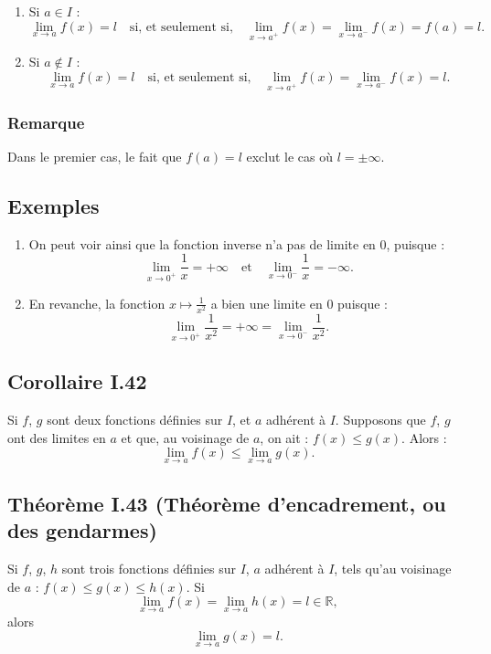 \documentclass{article}
\begin{document}
	\begin{enumerate}
		\item Si $a \in I$ : 
		\[
		\lim_{x \to a} f(x) = l \quad \text{si, et seulement si,} \quad \lim_{x \to a^+} f(x) = \lim_{x \to a^-} f(x) = f(a) = l.
		\]
		
		\item Si $a \notin I$ : 
		\[
		\lim_{x \to a} f(x) = l \quad \text{si, et seulement si,} \quad \lim_{x \to a^+} f(x) = \lim_{x \to a^-} f(x) = l.
		\]
	\end{enumerate}
	
	\subsubsection*{Remarque}
	
	Dans le premier cas, le fait que $f(a) = l$ exclut le cas où $l = \pm \infty$.
	
	\subsection{Exemples}
	
	\begin{enumerate}
		\item On peut voir ainsi que la fonction inverse n’a pas de limite en 0, puisque :
		\[
		\lim_{x \to 0^+} \frac{1}{x} = +\infty \quad \text{et} \quad \lim_{x \to 0^-} \frac{1}{x} = -\infty.
		\]
		
		\item En revanche, la fonction $x \mapsto \frac{1}{x^2}$ a bien une limite en 0 puisque :
		\[
		\lim_{x \to 0^+} \frac{1}{x^2} = +\infty = \lim_{x \to 0^-} \frac{1}{x^2}.
		\]
	\end{enumerate}
	\subsection{Corollaire I.42}
	Si \( f \), \( g \) sont deux fonctions définies sur \( I \), et \( a \) adhérent à \( I \). Supposons que \( f \), \( g \) ont des limites en \( a \) et que, au voisinage de \( a \), on ait : \( f(x) \leq g(x) \). Alors :
	\[
	\lim_{x \to a} f(x) \leq \lim_{x \to a} g(x).
	\]
	
	\subsection{Théorème I.43 (Théorème d'encadrement, ou des gendarmes)}
	Si \( f \), \( g \), \( h \) sont trois fonctions définies sur \( I \), \( a \) adhérent à \( I \), tels qu'au voisinage de \( a \) : \( f(x) \leq g(x) \leq h(x) \). Si
	\[
	\lim_{x \to a} f(x) = \lim_{x \to a} h(x) = l \in \mathbb{R},
	\]
	alors
	\[
	\lim_{x \to a} g(x) = l.
	\]
\end{document}
